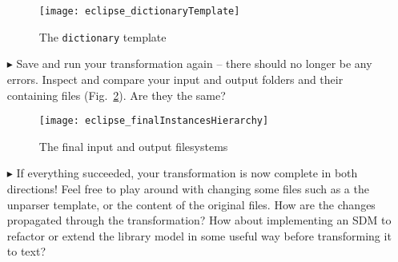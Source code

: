 \begin{itemize}
\vspace{0.5cm}

\begin{figure}[htpb]
\begin{center}
  \texttt{[image: eclipse\_dictionaryTemplate]}
  \caption{The \texttt{dictionary} template}
  \label{eclipse:dictionaryTemplate}
\end{center}
\end{figure}


\item[$\blacktriangleright$] Save and run your transformation again -- there should no longer be any errors. Inspect and compare your input and
output folders and their containing files (Fig.~\ref{eclipse:unparseResult}). Are they the same?

\vspace{0.5cm}

\begin{figure}[htpb]
\begin{center}
  \texttt{[image: eclipse\_finalInstancesHierarchy]}
  \caption{The final input and output filesystems}
  \label{eclipse:unparseResult}
\end{center}
\end{figure}

\item[$\blacktriangleright$] If everything succeeded, your transformation is now complete in both directions! Feel free to play around with
changing some files such as a the unparser template, or the content of the original files. How are the changes propagated through the transformation?
How about implementing an SDM to refactor or extend the library model in some useful way before transforming it to text?

\end{itemize}